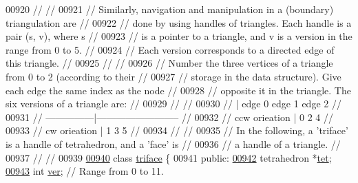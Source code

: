 \begin{DoxyCode}
00920 \textcolor{comment}{//                                                                           //}
00921 \textcolor{comment}{// Similarly, navigation and manipulation in a (boundary) triangulation are  //}
00922 \textcolor{comment}{// done by using handles of triangles. Each handle is a pair (s, v), where s //}
00923 \textcolor{comment}{// is a pointer to a triangle, and v is a version in the range from 0 to 5.  //}
00924 \textcolor{comment}{// Each version corresponds to a directed edge of this triangle.             //}
00925 \textcolor{comment}{//                                                                           //}
00926 \textcolor{comment}{// Number the three vertices of a triangle from 0 to 2 (according to their   //}
00927 \textcolor{comment}{// storage in the data structure). Give each edge the same index as the node //}
00928 \textcolor{comment}{// opposite it in the triangle. The six versions of a triangle are:          //}
00929 \textcolor{comment}{//                                                                           //}
00930 \textcolor{comment}{//                 | edge 0   edge 1   edge 2                                //}
00931 \textcolor{comment}{//  ---------------|--------------------------                               //}
00932 \textcolor{comment}{//   ccw orieation |   0        2        4                                   //}
00933 \textcolor{comment}{//    cw orieation |   1        3        5                                   //}
00934 \textcolor{comment}{//                                                                           //}
00935 \textcolor{comment}{// In the following, a 'triface' is a handle of tetrahedron, and a 'face' is //}
00936 \textcolor{comment}{// a handle of a triangle.                                                   //}
00937 \textcolor{comment}{//                                                                           //}
00939 \textcolor{comment}{}
\hypertarget{tetgen_8h_source.tex_l00940}{}\hyperlink{classtetgenmesh_1_1triface}{00940}   \textcolor{keyword}{class }\hyperlink{classtetgenmesh_1_1triface}{triface} \{
00941   \textcolor{keyword}{public}:
\hypertarget{tetgen_8h_source.tex_l00942}{}\hyperlink{classtetgenmesh_1_1triface_ad3b174c4040b18a5286ddfeb8db02529}{00942}     tetrahedron *\hyperlink{classtetgenmesh_1_1triface_ad3b174c4040b18a5286ddfeb8db02529}{tet};
\hypertarget{tetgen_8h_source.tex_l00943}{}\hyperlink{classtetgenmesh_1_1triface_a2b2b1dc34da73125359d6db535d75f7c}{00943}     \textcolor{keywordtype}{int} \hyperlink{classtetgenmesh_1_1triface_a2b2b1dc34da73125359d6db535d75f7c}{ver}; \textcolor{comment}{// Range from 0 to 11.}

\end{DoxyCode}
